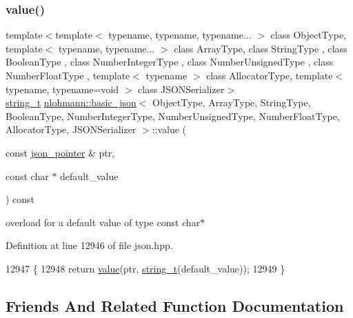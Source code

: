 \subsubsection{\texorpdfstring{value()}{value()}\hspace{0.1cm}{\footnotesize\ttfamily [4/4]}}
{\footnotesize\ttfamily template$<$template$<$ typename, typename, typename... $>$ class Object\+Type, template$<$ typename, typename... $>$ class Array\+Type, class String\+Type , class Boolean\+Type , class Number\+Integer\+Type , class Number\+Unsigned\+Type , class Number\+Float\+Type , template$<$ typename $>$ class Allocator\+Type, template$<$ typename, typename=void $>$ class J\+S\+O\+N\+Serializer$>$ \\
\hyperlink{classnlohmann_1_1basic__json_a61f8566a1a85a424c7266fb531dca005}{string\+\_\+t} \hyperlink{classnlohmann_1_1basic__json}{nlohmann\+::basic\+\_\+json}$<$ Object\+Type, Array\+Type, String\+Type, Boolean\+Type, Number\+Integer\+Type, Number\+Unsigned\+Type, Number\+Float\+Type, Allocator\+Type, J\+S\+O\+N\+Serializer $>$\+::value (\begin{DoxyParamCaption}\item[{const \hyperlink{classnlohmann_1_1basic__json_a6886a5001f5b449ad316101a311ce536}{json\+\_\+pointer} \&}]{ptr,  }\item[{const char $\ast$}]{default\+\_\+value }\end{DoxyParamCaption}) const\hspace{0.3cm}{\ttfamily [inline]}}



overload for a default value of type const char$\ast$ 



Definition at line 12946 of file json.\+hpp.


\begin{DoxyCode}
12947     \{
12948         \textcolor{keywordflow}{return} \hyperlink{classnlohmann_1_1basic__json_adcf8ca5079f5db993820bf50036bf45d}{value}(ptr, \hyperlink{classnlohmann_1_1basic__json_a61f8566a1a85a424c7266fb531dca005}{string\_t}(default\_value));
12949     \}
\end{DoxyCode}


\subsection{Friends And Related Function Documentation}
\mbox{\label{classnlohmann_1_1basic__json_af0bb1c07bf0d88f8b86a235c92893a39}} 
